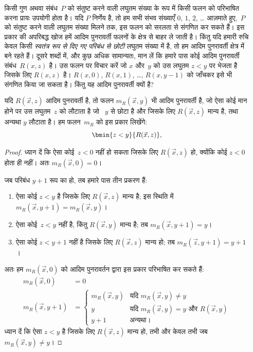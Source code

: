 \documentclass[../../../include/open-logic-section]{subfiles}
\begin{document}

\begin{explain}
किसी गुण अथवा संबंध~$P$ को संतुष्ट करने वाली लघुतम संख्या के रूप में
किसी फलन को परिभाषित करना प्रायः उपयोगी होता है। यदि $P$ निर्णेय है, तो
हम सभी संभव संख्याएँ $0$, $1$, $2$, \dots{} आज़माते हुए,~$P$ को
संतुष्ट करने वाली लघुतम संख्या मिलने तक, इस फलन को सरलता से संगणित कर
सकते हैं। इस प्रकार की अपरिबद्ध खोज हमें आदिम पुनरावर्ती फलनों के क्षेत्र
से बाहर ले जाती है। किंतु यदि हमारी रुचि केवल किसी \emph{स्वतंत्र रूप से
दिए गए परिबंध से छोटी} लघुतम संख्या में है, तो हम आदिम पुनरावर्ती क्षेत्र
में बने रहते हैं। दूसरे शब्दों में, और कुछ अधिक सामान्यतः, मान लें कि
हमारे पास कोई आदिम पुनरावर्ती संबंध~$R(x,z)$ है। उस फलन पर विचार करें जो
$x$ और~$y$ को उस लघुतम $z < y$ पर भेजता है जिसके लिए $R(x, z)$ है।
$R(x, 0)$, $R(x, 1)$, \dots, $R(x, y-1)$ को जाँचकर इसे भी संगणित किया
जा सकता है। किंतु यह आदिम पुनरावर्ती क्यों है?
\end{explain}

\begin{prop}
यदि $R(\vec x, z)$ आदिम पुनरावर्ती है, तो फलन $m_R(\vec{x}, y)$ भी
आदिम पुनरावर्ती है, जो ऐसा कोई मान होने पर उस लघुतम~$z$ को लौटाता है जो
~$y$ से छोटा है और जिसके लिए $R(\vec x, z)$ मान्य है, तथा अन्यथा $y$
लौटाता है। हम फलन~$m_R$ को इस प्रकार लिखेंगे:
\[
\bmin{z < y}{R(\vec{x}, z)},
\]
\end{prop}

\begin{proof}
ध्यान दें कि ऐसा कोई~$z < 0$ नहीं हो सकता जिसके लिए $R(\vec{x}, z)$
हो, क्योंकि कोई $z < 0$ होता ही नहीं। अतः $m_R(\vec x, 0) = 0$।

जब परिबंध $y + 1$ रूप का हो, तब हमारे पास तीन प्रकरण हैं:
\begin{enumerate}
\item ऐसा कोई $z < y$ है जिसके लिए $R(\vec{x}, z)$ मान्य है; इस
स्थिति में $m_R(\vec{x}, y+1) = m_R(\vec{x}, y)$।
\item ऐसा कोई~$z<y$ नहीं है, किंतु $R(\vec{x}, y)$ मान्य है; तब
$m_R(\vec{x}, y+1) = y$।
\item ऐसा कोई $z < y+1$ नहीं है जिसके लिए $R(\vec{x}, z)$ मान्य हो;
तब $m_R(\vec{z}, y+1) = y+1$।
\end{enumerate}
अतः हम $m_R(\vec x, 0)$ को आदिम पुनरावर्तन द्वारा इस प्रकार परिभाषित कर सकते हैं:
\begin{align*}
m_R(\vec{x}, 0) & = 0\\
m_R(\vec{x}, y+1) & =
\begin{cases}
m_R(\vec{x}, y) & \text{यदि $m_R(\vec x, y) \neq y$}\\
y & \text{यदि $m_R(\vec x, y) = y$ और $R(\vec{x}, y)$}\\
y+1 & \text{अन्यथा।}
\end{cases}
\end{align*}
ध्यान दें कि ऐसा $z<y$ है जिसके लिए $R(\vec x, z)$ मान्य हो, तभी और
केवल तभी जब $m_R(\vec x,
y) \neq y$।
\end{proof}
\end{document}
